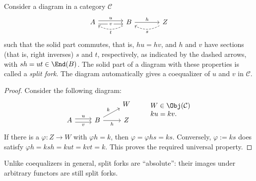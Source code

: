 \begin{definition-proposition}
	Consider a diagram in a category $\mathcal{C}$
	\begin{equation*}\label{eqn:split-coeq}\begin{tikzcd}[column sep=large]
		A \arrow[shift left, r, "u"] \arrow[shift right, r, "v" description] & B \arrow[r, "h"] \arrow[dashed, l, bend left, "t"] & Z \arrow[dashed, l, bend left, "s"]
	\end{tikzcd}\end{equation*}
	such that the solid part commutes, that is, $hu=hv$, and $h$ and $v$ have
	sections (that is, right inverses) $s$ and $t$, respectively, as indicated
	by the dashed arrows, with $sh=ut\in\End(B)$. The solid part of a diagram
	with these properties is called a \emph{split fork}. The diagram
	automatically gives a coequalizer of $u$ and $v$ in $\mathcal{C}$.
\end{definition-proposition}
\begin{proof}
	Consider the following diagram:
	\[\begin{tikzcd}[row sep=small]
		& & W \\
		A \arrow[shift left, r, "u"] \arrow[shift right, r, "v"'] & B \arrow[r, "h"'] \arrow[ru, "k"] & Z
	\end{tikzcd} \qquad \begin{array}{ll}
		W \in \Obj(\mathcal{C}) \\
		ku = kv.
	\end{array} \]
	If there is a $\varphi:Z\to W$ with $\varphi h=k$, then
	$\varphi=\varphi hs=ks$. Conversely, $\varphi:=ks$ does satisfy
	$\varphi h=ksh=kut=kvt=k$. This proves the required universal property.
\end{proof}

Unlike coequalizers in general, split forks are ``absolute'': their images
under arbitrary functors are still split forks.

